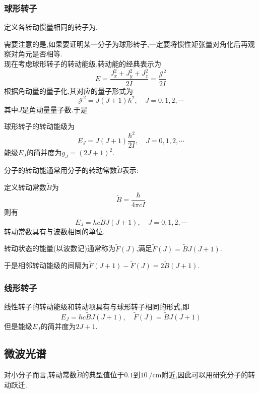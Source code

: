 \documentclass{ctexbook}
\begin{document}
\subsubsection{球形转子}
\begin{definition}[球形转子]
    定义各转动惯量相同的转子为.
\end{definition}
需要注意的是,如果要证明某一分子为球形转子,一定要将惯性矩张量对角化后再观察对角元是否相等.\\
\indent 现在考虑球形转子的转动能级.转动能的经典表示为
\[E=\dfrac{J_x^2+J_y^2+J_z^2}{2I}=\dfrac{\mathcal{J}^2}{2I}\]
根据角动量的量子化,其对应的量子形式为
\[\mathcal{J}^2=J(J+1)\hbar^2,\quad J=0,1,2,\cdots\]
其中$J$是角动量量子数.于是
\begin{theorem}[球形转子的转动能级]
    球形转子的转动能级为
    \[E_J=J(J+1)\dfrac{\hbar^2}{2I},\quad J=0,1,2,\cdots\]
    能级$E_J$的简并度为$g_J=(2J+1)^2$.
\end{theorem}
分子的转动能通常用分子的转动常数$\tilde{B}$表示:
\begin{definition}[转动常数]
    定义转动常数$\tilde{B}$为
    \[\tilde{B}=\dfrac{\hbar}{4\pi cI}\]
    则有
    \[E_J=hc\tilde{B}J(J+1),\quad J=0,1,2,\cdots\]
    转动常数具有与波数相同的单位.
\end{definition}
\begin{definition}[转动项]
    转动状态的能量(以波数记)通常称为$\tilde{F}(J)$,满足$\tilde{F}(J)=\tilde{B}J(J+1)$.
\end{definition}
于是相邻转动能级的间隔为$\tilde{F}(J+1)-\tilde{F}(J)=2\tilde{B}(J+1)$.
\subsubsection{线形转子}
\begin{theorem}[线形转子的转动能级和转动项]
    线性转子的转动能级和转动项具有与球形转子相同的形式,即
    \[E_J=hc\tilde{B}J(J+1),\quad\tilde{F}(J)=\tilde{B}J(J+1)\]
    但是能级$E_J$的简并度为$2J+1$.
\end{theorem}
\subsection{微波光谱}
对小分子而言,转动常数$\tilde{B}$的典型值位于$0.1$到$\SI{10}{\per\centi\meter}$附近,因此可以用研究分子的转动跃迁.
\end{document}
